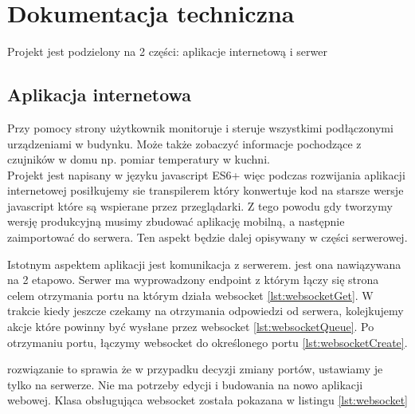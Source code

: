 \chapter{Dokumentacja techniczna}%
Projekt jest podzielony na 2 części: aplikacje internetową i serwer
\section{Aplikacja internetowa}
Przy pomocy strony użytkownik monitoruje i steruje wszystkimi podłączonymi urządzeniami w budynku. Może także zobaczyć informacje pochodzące z czujników w domu np. pomiar temperatury w kuchni. \\
Projekt jest napisany w języku javascript ES6+ więc podczas rozwijania aplikacji internetowej posiłkujemy sie transpilerem który konwertuje kod na starsze wersje javascript które są wspierane przez przeglądarki. Z tego powodu gdy tworzymy wersję produkcyjną musimy zbudować aplikację mobilną, a następnie zaimportować do serwera. Ten aspekt będzie dalej opisywany w części serwerowej.
\par Istotnym aspektem aplikacji jest komunikacja z serwerem. jest ona nawiązywana na 2 etapowo.
Serwer ma wyprowadzony endpoint z którym łączy się strona celem otrzymania portu na którym działa websocket \ref{lst:websocketGet}. W trakcie kiedy jeszcze czekamy na otrzymania odpowiedzi od serwera, kolejkujemy akcje które powinny być wysłane przez websocket \ref{lst:websocketQueue}. Po otrzymaniu portu, łączymy websocket do określonego portu \ref{lst:websocketCreate}. 
\par rozwiązanie to sprawia że w przypadku decyzji zmiany portów, ustawiamy je tylko na serwerze. Nie ma potrzeby edycji i budowania na nowo aplikacji webowej. Klasa obsługująca websocket została pokazana w listingu \ref{lst:websocket}
\newpage
